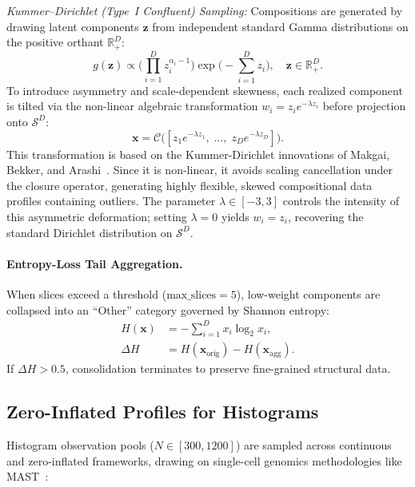 \documentclass[11pt,twocolumn]{article}
\newcommand{\simplex}{\mathcal{S}}
\newcommand{\closure}{\mathcal{C}}
\newcommand{\R}{\mathbb{R}}
\begin{document}
\noindent\emph{Kummer--Dirichlet (Type~I Confluent) Sampling:}
Compositions are generated by drawing latent components $\mathbf{z}$ from independent standard Gamma distributions on the positive orthant $\R_+^D$:
\begin{equation}\label{eq:kdga_raw}
  g(\mathbf{z}) \propto \biggl(\prod_{i=1}^D z_i^{\alpha_i - 1}\biggr)\exp\biggl(-\sum_{i=1}^D z_i\biggr),\quad \mathbf{z} \in \R_+^D.
\end{equation}
To introduce asymmetry and scale-dependent skewness, each realized component is tilted via the non-linear algebraic transformation $w_i = z_i e^{-\lambda z_i}$ before projection onto $\simplex^D$:
\begin{equation}\label{eq:kdga_closure}
  \mathbf{x} = \closure\!\bigl([z_1 e^{-\lambda z_1},\;\dots,\;z_D e^{-\lambda z_D}]\bigr).
\end{equation}
This transformation is based on the Kummer-Dirichlet innovations of Makgai, Bekker, and Arashi~\cite{makgai2021compositional}. Since it is non-linear, it avoids scaling cancellation under the closure operator, generating highly flexible, skewed compositional data profiles containing outliers. The parameter $\lambda \in [-3, 3]$ controls the intensity of this asymmetric deformation; setting $\lambda = 0$ yields $w_i = z_i$, recovering the standard Dirichlet distribution on $\simplex^D$.

\paragraph{Entropy-Loss Tail Aggregation.}
When slices exceed a threshold ($\text{max\_slices}=5$), low-weight components are collapsed into an ``Other'' category governed by Shannon entropy:
\begin{align}
  H(\mathbf{x}) &= -\sum_{i=1}^D x_i \log_2 x_i, \label{eq:entropy}\\
  \Delta H &= H(\mathbf{x}_{\text{orig}}) - H(\mathbf{x}_{\text{agg}}). \label{eq:entropy_loss}
\end{align}
If $\Delta H > 0.5$, consolidation terminates to preserve fine-grained structural data.

\subsection{Zero-Inflated Profiles for Histograms}\label{sec:zeroinflated}

Histogram observation pools ($N \in [300, 1200]$) are sampled across continuous and zero-inflated frameworks, drawing on single-cell genomics methodologies like MAST~\cite{finak2015mast}:
\end{document}
